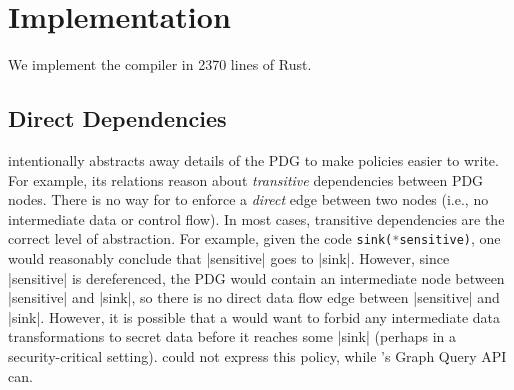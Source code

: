 \section{Implementation}
\label{sec:limitations}
We implement the \syslang{} compiler in 2370 lines of Rust.

\subsection{Direct Dependencies}
\syslang{} intentionally abstracts away details of the PDG to make policies easier to write.
%
For example, its relations reason about \emph{transitive} dependencies between PDG nodes.
%
There is no way for \ces{} to enforce a \emph{direct} edge between two nodes (i.e., no intermediate data or control flow).
%
In most cases, transitive dependencies are the correct level of abstraction.
%
For example, given the code \lstinline[language=Rust]|sink(*sensitive)|,
one would reasonably conclude that |sensitive| goes to |sink|.
%
However, since |sensitive| is dereferenced, the PDG would contain an intermediate node between |sensitive| and |sink|,
so there is no direct data flow edge between |sensitive| and |sink|.
%
However, it is possible that a \dev{} would want to forbid any intermediate data transformations
to secret data before it reaches some |sink| (perhaps in a security-critical setting).
%
\syslang{} could not express this policy, while \sys{}'s Graph Query API can.

